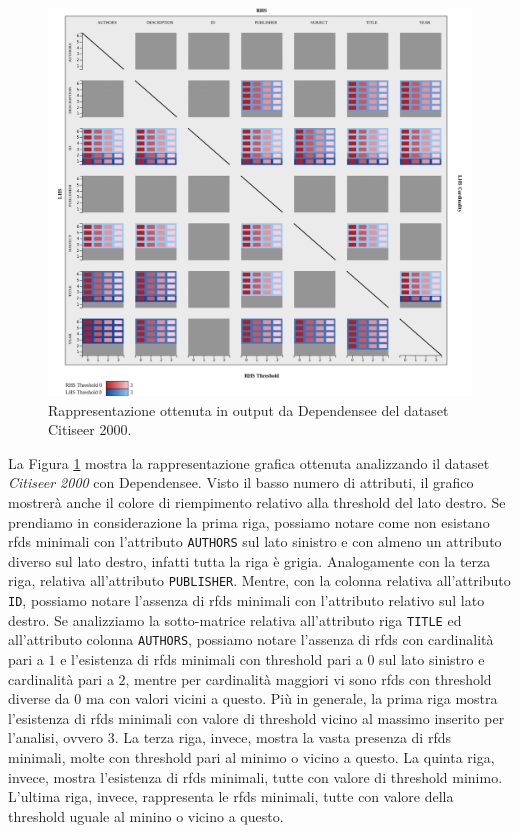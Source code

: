 \begin{figure}[ht]
    \centering
    \includegraphics[width=\linewidth]{capitoli/figure/citiseer_2000_result}
    \caption{Rappresentazione ottenuta in output da Dependensee del dataset Citiseer 2000.}
    \label{fig:citiseer_2000_result}
\end{figure}
La Figura \ref{fig:citiseer_2000_result} mostra la rappresentazione grafica ottenuta analizzando il dataset \textit{Citiseer 2000} con Dependensee. Visto il basso numero di attributi, il grafico mostrer\`{a} anche il colore di riempimento relativo alla threshold del lato destro. Se prendiamo in considerazione la prima riga, possiamo notare come non esistano \acrlong{rfds} minimali con l'attributo \texttt{AUTHORS} sul lato sinistro e con almeno un attributo diverso sul lato destro, infatti tutta la riga \`{e} grigia. Analogamente con la terza riga, relativa all'attributo \texttt{PUBLISHER}. Mentre, con la colonna relativa all'attributo \texttt{ID}, possiamo notare l'assenza di \acrlong{rfds} minimali con l'attributo relativo sul lato destro. Se analizziamo la sotto-matrice relativa all'attributo riga \texttt{TITLE} ed all'attributo colonna \texttt{AUTHORS}, possiamo notare l'assenza di \acrlong{rfds} con cardinalit\`{a} pari a $1$ e l'esistenza di \acrlong{rfds} minimali con threshold pari a $0$ sul lato sinistro e cardinalit\`{a} pari a $2$, mentre per cardinalit\`{a} maggiori vi sono \acrlong{rfds} con threshold diverse da $0$ ma con valori vicini a questo. Pi\`{u} in generale, la prima riga mostra l'esistenza di \acrlong{rfds} minimali con valore di threshold vicino al massimo inserito per l'analisi, ovvero $3$. La terza riga, invece, mostra la vasta presenza di \acrlong{rfds} minimali, molte con threshold pari al minimo o vicino a questo. La quinta riga, invece, mostra l'esistenza di \acrlong{rfds} minimali, tutte con valore di threshold minimo. L'ultima riga, invece, rappresenta le \acrshort{rfds} minimali, tutte con valore della threshold uguale al minino o vicino a questo.\par
